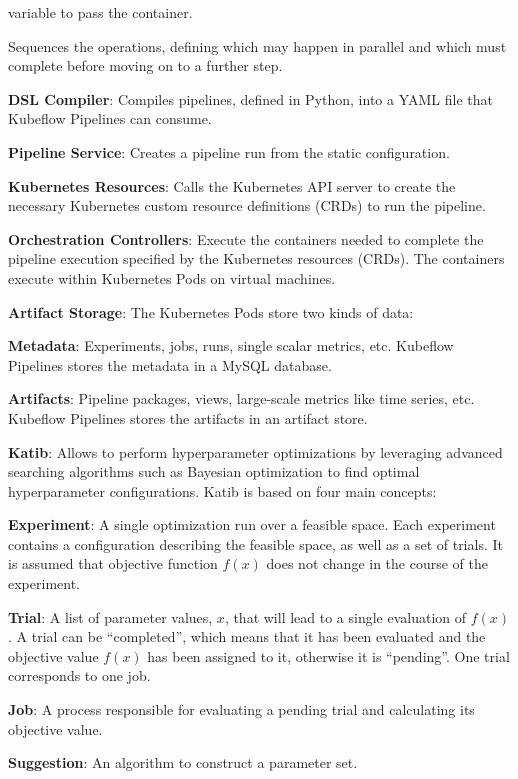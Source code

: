 variable to pass the container.
\item Sequences the operations, defining which may happen in parallel and which must complete before moving on to a
further step.
\eit
\item \textbf{DSL Compiler}: Compiles pipelines, defined in Python, into a YAML file that Kubeflow Pipelines can
consume.
\item \textbf{Pipeline Service}: Creates a pipeline run from the static configuration.
\item \textbf{Kubernetes Resources}: Calls the Kubernetes API server to create the necessary Kubernetes custom resource
definitions (CRDs) to run the pipeline.
\item \textbf{Orchestration Controllers}: Execute the containers needed to complete the pipeline execution specified by
the Kubernetes resources (CRDs). The containers execute within Kubernetes Pods on virtual machines.
\item \textbf{Artifact Storage}: The Kubernetes Pods store two kinds of data:
\bit
\item \textbf{Metadata}: Experiments, jobs, runs, single scalar metrics, etc. Kubeflow Pipelines stores the metadata in
a MySQL database.
\item \textbf{Artifacts}: Pipeline packages, views, large-scale metrics like time series, etc. Kubeflow Pipelines stores
the artifacts in an artifact store.
\eit
\eit
\item \textbf{Katib}: Allows to perform hyperparameter optimizations by leveraging advanced searching algorithms such
as Bayesian optimization to find optimal hyperparameter configurations. Katib is based on four main concepts:
\bit
\item \textbf{Experiment}: A single optimization run over a feasible space. Each experiment contains a configuration
describing the feasible space, as well as a set of trials. It is assumed that objective function $f(x)$ does not
change in the course of the experiment.
\item \textbf{Trial}: A list of parameter values, $x$, that will lead to a single evaluation of $f(x)$. A trial can
be ``completed'', which means that it has been evaluated and the objective value $f(x)$ has been assigned to it,
otherwise it is ``pending''. One trial corresponds to one job.
\item \textbf{Job}: A process responsible for evaluating a pending trial and calculating its objective value.
\item \textbf{Suggestion}: An algorithm to construct a parameter set.
